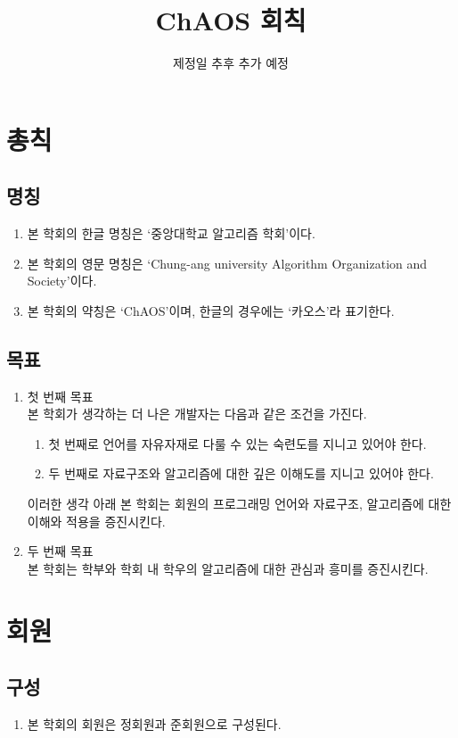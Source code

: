 \documentclass{oblivoir}
\title{ChAOS 회칙}
\date{제정일 추후 추가 예정}
\begin{document}
\maketitle

\chapter{총칙}

\section{명칭}
\begin{enumerate}
    \item 본 학회의 한글 명칭은 `중앙대학교 알고리즘 학회'이다.
    \item 본 학회의 영문 명칭은 `Chung-ang university Algorithm Organization and Society'이다.
    \item 본 학회의 약칭은 `ChAOS'이며, 한글의 경우에는 `카오스'라 표기한다.
\end{enumerate}

\section{목표}
\begin{enumerate}
    \item 첫 번째 목표 \\ 본 학회가 생각하는 더 나은 개발자는 다음과 같은 조건을 가진다.
          \begin{enumerate}
              \item 첫 번째로 언어를 자유자재로 다룰 수 있는 숙련도를 지니고 있어야 한다.
              \item 두 번째로 자료구조와 알고리즘에 대한 깊은 이해도를 지니고 있어야 한다.
          \end{enumerate}
          이러한 생각 아래 본 학회는 회원의 프로그래밍 언어와 자료구조, 알고리즘에 대한 이해와 적용을 증진시킨다.
    \item 두 번째 목표 \\ 본 학회는 학부와 학회 내 학우의 알고리즘에 대한 관심과 흥미를 증진시킨다.
\end{enumerate}

\chapter{회원}
\label{회원 장}

\section{구성}
\begin{enumerate}
    \item 본 학회의 회원은 정회원과 준회원으로 구성된다.
\end{enumerate}
\end{document}
